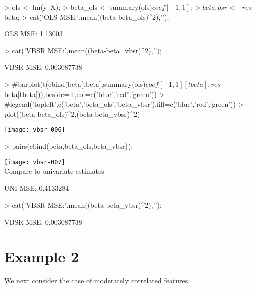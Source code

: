 \documentclass[a4paper]{article}
\begin{document}
\begin{Schunk}
\begin{Sinput}
> ols <- lm(y~X);
> beta_ols <- summary(ols)$coef[-1,1];
> beta_vbsr <- res$beta;
> cat('OLS MSE:',mean((beta-beta_ols)^2),'\n');
\end{Sinput}
\begin{Soutput}
OLS MSE: 1.13003 
\end{Soutput}
\begin{Sinput}
> cat('VBSR MSE:',mean((beta-beta_vbsr)^2),'\n');
\end{Sinput}
\begin{Soutput}
VBSR MSE: 0.003087738 
\end{Soutput}
\end{Schunk}
\begin{Schunk}
\begin{Sinput}
> #barplot(t(cbind(beta[tbeta],summary(ols)$coef[-1,1][tbeta],res$beta[tbeta])),beside=T,col=c('blue','red','green'))
> #legend('topleft',c('beta','beta_ols','beta_vbsr'),fill=c('blue','red','green'))
> plot((beta-beta_ols)^2,(beta-beta_vbsr)^2)
\end{Sinput}
\end{Schunk}
\texttt{[image: vbsr-006]}
\begin{Schunk}
\begin{Sinput}
> pairs(cbind(beta,beta_ols,beta_vbsr));
\end{Sinput}
\end{Schunk}
\texttt{[image: vbsr-007]}
\\
Compare to univariate estimates
\begin{Schunk}
\begin{Soutput}
UNI MSE: 0.4133284 
\end{Soutput}
\begin{Sinput}
> cat('VBSR MSE:',mean((beta-beta_vbsr)^2),'\n');
\end{Sinput}
\begin{Soutput}
VBSR MSE: 0.003087738 
\end{Soutput}
\end{Schunk}

\section{Example 2}
We next consider the case of moderately correlated features.
\end{document}
